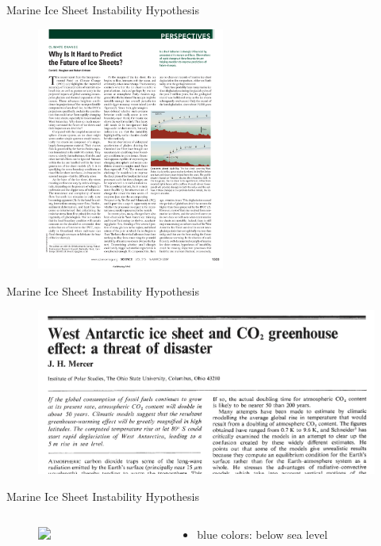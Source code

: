 \documentclass[hide notes,intlimits]{beamer}
\begin{document}
\begin{frame}[label=misi]{Marine Ice Sheet Instability Hypothesis}
 \begin{figure}
    \includegraphics[height=8cm]{vaughan-misi}
  \end{figure}
\end{frame}

\begin{frame}{Marine Ice Sheet Instability Hypothesis}
 \begin{figure}
    \includegraphics[width=\textwidth]{mercer_1978}
  \end{figure}
\end{frame}

\begin{frame}{Marine Ice Sheet Instability Hypothesis}
  \begin{columns}[c]
    \begin{column}{.65\linewidth}
      \begin{figure}
        \includegraphics<1>[height=8cm]{ant-marine}
      \end{figure}
    \end{column}
    \begin{column}{.38\linewidth}
      \begin{itemize}
      \item blue colors: below sea level
      \end{itemize}
    \end{column}
  \end{columns}
\end{frame}
\end{document}
